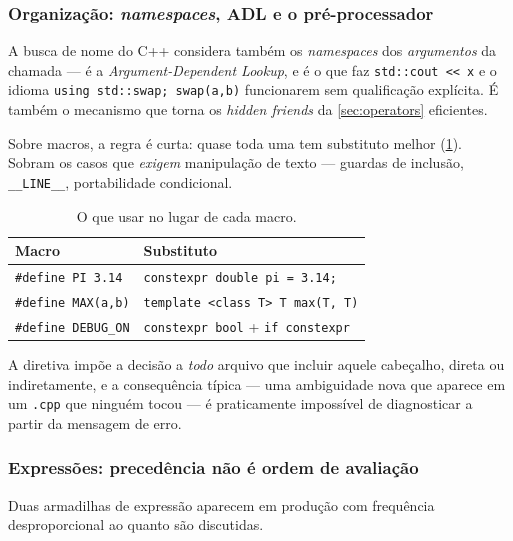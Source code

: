 \subsubsection{Organização: \emph{namespaces}, ADL e o pré-processador}

A busca de nome do C++ considera também os \emph{namespaces} dos
\emph{argumentos} da chamada --- é a \emph{Argument-Dependent Lookup}, e é o que
faz \texttt{std::cout << x} e o idioma \texttt{using std::swap; swap(a,b)}
funcionarem sem qualificação explícita. É também o mecanismo que torna os
\emph{hidden friends} da \cref{sec:operators} eficientes.

Sobre macros, a regra é curta: quase toda uma tem substituto melhor
(\cref{tab:macros}). Sobram os casos que \emph{exigem} manipulação de texto ---
guardas de inclusão, \texttt{\_\_LINE\_\_}, portabilidade condicional.

\begin{table}[htbp]
\centering
\caption{O que usar no lugar de cada macro.}
\label{tab:macros}
\footnotesize
\begin{tabular}{@{}ll@{}}
\toprule
\textbf{Macro} & \textbf{Substituto} \\
\midrule
\texttt{\#define PI 3.14}   & \texttt{constexpr double pi = 3.14;} \\
\texttt{\#define MAX(a,b)}  & \texttt{template <class T> T max(T, T)} \\
\texttt{\#define DEBUG\_ON} & \texttt{constexpr bool} + \texttt{if constexpr} \\
\bottomrule
\end{tabular}
\end{table}

\begin{regra}
A diretiva impõe a decisão a \emph{todo} arquivo que incluir aquele cabeçalho,
direta ou indiretamente, e a consequência típica --- uma ambiguidade nova que
aparece em um \texttt{.cpp} que ninguém tocou --- é praticamente impossível de
diagnosticar a partir da mensagem de erro.
\end{regra}

\subsubsection{Expressões: precedência não é ordem de avaliação}

Duas armadilhas de expressão aparecem em produção com frequência
desproporcional ao quanto são discutidas.

